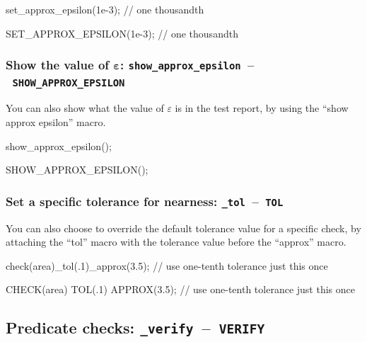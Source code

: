 \documentclass[twoside, a4paper, article]{memoir}
\newcommand*\testudocolor{\color{red!80!blue}}
\newcommand*\testudo[1]{\texttt{\testudocolor{}#1}}
\newcommand*\testudopair[2]{\testudo{#1}~--~\testudo{#2}}
\newcommand\subsectiontestudopair[3]{%
  \subsection[#1]{#1: \testudopair{#2}{#3}}}
\newcommand\subsubsectiontestudopair[3]{%
  \subsubsection[#1]{#1: \testudopair{#2}{#3}}}
\begin{document}
\begin{cpplisting}
set_approx_epsilon(1e-3); // one thousandth
\end{cpplisting}

\begin{cpplisting}
SET_APPROX_EPSILON(1e-3); // one thousandth
\end{cpplisting}

\subsubsectiontestudopair{Show the value of $\bm{\varepsilon}$}%
  {show\_approx\_epsilon}{SHOW\_APPROX\_EPSILON}
\label{sec:show-value-epsilon}

You can also show what the value of $\varepsilon$ is in the test report, by
using the ``show approx epsilon'' macro.

\begin{cpplisting}
show_approx_epsilon();
\end{cpplisting}

\begin{cpplisting}
SHOW_APPROX_EPSILON();
\end{cpplisting}

\subsubsectiontestudopair{Set a specific tolerance for nearness}%
  {\_tol}{TOL}
\label{sec:specify-tolerance-nearness}

You can also choose to override the default tolerance value for a specific
check, by attaching the ``tol'' macro with the tolerance value before the
``approx'' macro.

\begin{cpplisting}
check(area)_tol(.1)_approx(3.5); // use one-tenth tolerance just this once
\end{cpplisting}

\begin{cpplisting}
CHECK(area) TOL(.1) APPROX(3.5); // use one-tenth tolerance just this once
\end{cpplisting}


\subsectiontestudopair{Predicate checks}{\_verify}{VERIFY}
\label{sec:predicate-checks}
\end{document}
